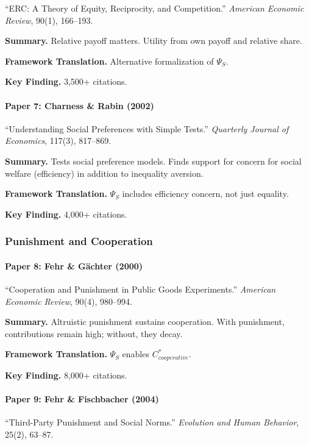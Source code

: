 ``ERC: A Theory of Equity, Reciprocity, and Competition.''
\textit{American Economic Review}, 90(1), 166--193.

\textbf{Summary.}
Relative payoff matters. Utility from own payoff and relative share.

\textbf{Framework Translation.}
Alternative formalization of $\Psi_S$.

\textbf{Key Finding.}
3,500+ citations.

\paragraph{Paper 7: Charness \& Rabin (2002)}

``Understanding Social Preferences with Simple Tests.''
\textit{Quarterly Journal of Economics}, 117(3), 817--869.

\textbf{Summary.}
Tests social preference models. Finds support for concern for social 
welfare (efficiency) in addition to inequality aversion.

\textbf{Framework Translation.}
$\Psi_S$ includes efficiency concern, not just equality.

\textbf{Key Finding.}
4,000+ citations.

\subsubsection{Punishment and Cooperation}

\paragraph{Paper 8: Fehr \& Gächter (2000)}

``Cooperation and Punishment in Public Goods Experiments.''
\textit{American Economic Review}, 90(4), 980--994.

\textbf{Summary.}
Altruistic punishment sustains cooperation. With punishment, contributions 
remain high; without, they decay.

\textbf{Framework Translation.}
$\Psi_S$ enables $C^*_{cooperative}$.

\textbf{Key Finding.}
8,000+ citations.

\paragraph{Paper 9: Fehr \& Fischbacher (2004)}

``Third-Party Punishment and Social Norms.''
\textit{Evolution and Human Behavior}, 25(2), 63--87.

